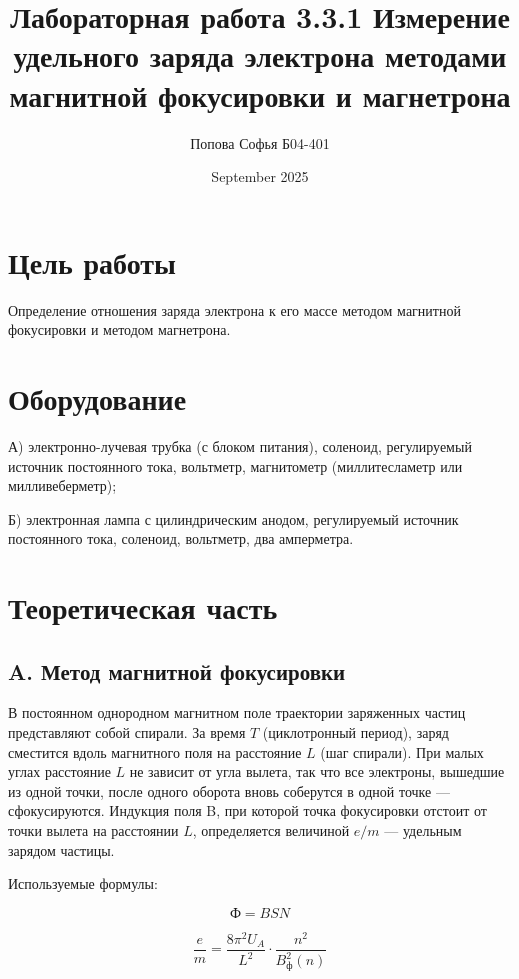 \documentclass{article}
\title{\textbf{Лабораторная работа 3.3.1} \linebreak
Измерение удельного заряда электрона методами
магнитной фокусировки и магнетрона}
\author{Попова Софья Б04-401}
\date{September 2025}
\begin{document}
\maketitle

\section*{Цель работы}
Определение отношения заряда электрона к его массе методом магнитной фокусировки и методом магнетрона.

\section*{Оборудование}
А) электронно-лучевая трубка (с блоком питания), соленоид, регулируемый источник постоянного тока, вольтметр,
магнитометр (миллитесламетр или милливеберметр); 

Б) электронная лампа с цилиндрическим анодом, регулируемый источник постоянного тока,
соленоид, вольтметр, два амперметра.

\section*{Теоретическая часть}

\subsection*{A. Метод магнитной фокусировки}
В постоянном однородном магнитном поле траектории заряженных частиц представляют собой спирали. За время $T$ (циклотронный период), заряд сместится вдоль магнитного поля на расстояние $L$ (шаг спирали). При малых углах расстояние $L$ не зависит от угла вылета, так что все электроны, вышедшие из одной точки, после одного оборота вновь соберутся в одной точке — сфокусируются. Индукция поля B, при которой точка фокусировки отстоит от точки вылета на расстоянии $L$, определяется величиной $e/m$ — удельным зарядом частицы.

Используемые формулы: 

\begin{equation}
    \text{Ф} = BSN
\end{equation}

\begin{equation}
\frac{e}{m} = \frac{8\pi^2 U_A}{L^2} \cdot \frac{n^2}{B_{\text{ф}}^2(n)}
\end{equation}
\end{document}
